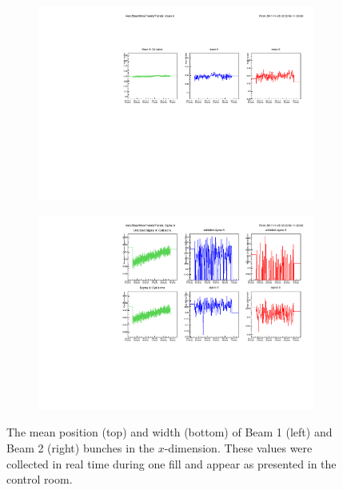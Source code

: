 \begin{figure}[!h]
    \centering
    \begin{subfigure}[m]{0.7\textwidth}
        \centering
        \includegraphics[width=1.0\textwidth]{figs/Detector/Beam_position_realtime.pdf}
    \end{subfigure}
    \begin{subfigure}[m]{0.7\textwidth}
        \centering
        \includegraphics[width=1.0\textwidth]{figs/Detector/Beam_sigma_realtime.pdf}
    \end{subfigure}
    \caption{The mean position (top) and width (bottom) of Beam 1 (left) and Beam 2 (right) bunches in the $x$-dimension. These values were collected in real time during one fill and appear as presented in the \lhcb control room.}
    \label{fig:Dec_bgi_realtime}   
\end{figure}



